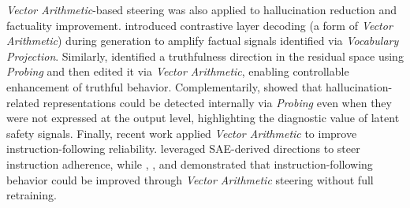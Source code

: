 \documentclass[11pt,letterpaper]{mystyle}
\begin{document}
  \textit{Vector Arithmetic}-based steering was also applied to hallucination reduction and factuality improvement. \citet{chuang2024dola} introduced contrastive layer decoding (a form of \textit{Vector Arithmetic}) during generation to amplify factual signals identified via \textit{Vocabulary Projection}. Similarly, \citet{zhang-etal-2024-truthx} identified a truthfulness direction in the residual space using \textit{Probing} and then edited it via \textit{Vector Arithmetic}, enabling controllable enhancement of truthful behavior. Complementarily, \citet{orgad2025llms} showed that hallucination-related representations could be detected internally via \textit{Probing} even when they were not expressed at the output level, highlighting the diagnostic value of latent safety signals. Finally, recent work applied \textit{Vector Arithmetic} to improve instruction-following reliability. \citet{he2025saif} leveraged SAE-derived directions to steer instruction adherence, while \citet{stolfo2025improving}, \citet{jiang2024refine}, and \citet{li2025training} demonstrated that instruction-following behavior could be improved through \textit{Vector Arithmetic} steering without full retraining.
  
  
\end{document}
